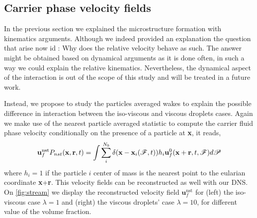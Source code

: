 \subsection{Carrier phase velocity fields}

In the previous section we explained the microstructure formation with kinematics   arguments.
Although we indeed provided an explanation the question that arise now id :
Why does the relative velocity behave as such.
The answer might be obtained based on dynamical arguments as it is done often, in such a way we could explain the relative kinematics. 
Nevertheless, the dynamical aspect of the interaction is out of the scope of this study and will be treated in a future work. 

Instead, we propose to study the particles averaged wakes to explain the possible difference in interaction between the iso-viscous and viscous droplets cases. 
Again we make use of the nearest particle averaged statistic to compute the carrier fluid phase velocity conditionally on the presence of a particle at \textbf{x}, it reads,
\begin{equation*}
    \textbf{u}^\text{nst}_f P_{nst}(\textbf{x},\textbf{r},t)= 
    \int \sum_{i}^{N_b} \delta(\textbf{x}-\textbf{x}_i(\mathscr{F},t))
    h_{i} 
    \textbf{u}_f^0(\textbf{x}+\textbf{r},t,\mathscr{F})
    d\mathscr{P} 
\end{equation*}
where $h_{i} = 1$ if the particle $i$ center of mass is the nearest point to the eularian coordinate \textbf{x}+\textbf{r}. 
This velocity fields can be reconstructed as well with our DNS. 
On \ref{fig:stream} we display the reconstructed velocity field $\textbf{u}^\text{nst}_f$ for (left) the iso-viscous case $\lambda =1$ and (right) the viscous droplets' case $\lambda = 10$, for different value of the volume fraction. 
